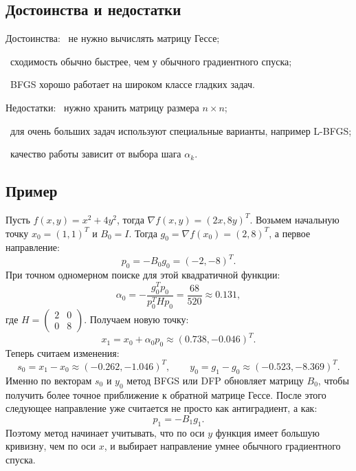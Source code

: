 \documentclass[12pt,a4paper]{article}
\begin{document}
\subsection{Достоинства и недостатки}
Достоинства:
\noindent\textbullet\ не нужно вычислять матрицу Гессе;\par
\noindent\textbullet\ сходимость обычно быстрее, чем у обычного градиентного спуска;\par
\noindent\textbullet\ BFGS хорошо работает на широком классе гладких задач.\par
Недостатки:
\noindent\textbullet\ нужно хранить матрицу размера $n\times n$;\par
\noindent\textbullet\ для очень больших задач используют специальные варианты, например L-BFGS;\par
\noindent\textbullet\ качество работы зависит от выбора шага $\alpha_k$.\par

\subsection{Пример}
Пусть $f(x,y)=x^2+4y^2$, тогда $\nabla f(x,y)=(2x,8y)^T.$
Возьмем начальную точку $x_0=(1,1)^T$ и $B_0=I.$
Тогда $g_0=\nabla f(x_0)=(2,8)^T$, а первое направление:
\[
p_0=-B_0g_0=(-2,-8)^T.
\]
При точном одномерном поиске для этой квадратичной функции:
\[
\alpha_0=-\frac{g_0^Tp_0}{p_0^THp_0}=\frac{68}{520}\approx 0.131,
\]
где $H=\begin{pmatrix}2&0\\0&8\end{pmatrix}.$
Получаем новую точку:
\[
x_1=x_0+\alpha_0p_0\approx (0.738,-0.046)^T.
\]
Теперь считаем изменения:
\[
s_0=x_1-x_0\approx(-0.262,-1.046)^T,\qquad
y_0=g_1-g_0\approx(-0.523,-8.369)^T.
\]
Именно по векторам $s_0$ и $y_0$ метод BFGS или DFP обновляет матрицу $B_0$, чтобы получить более точное приближение к обратной матрице Гессе.
После этого следующее направление уже считается не просто как антиградиент, а как:
\[
p_1=-B_1g_1.
\]
Поэтому метод начинает учитывать, что по оси $y$ функция имеет большую кривизну, чем по оси $x$, и выбирает направление умнее обычного градиентного спуска.
\end{document}
